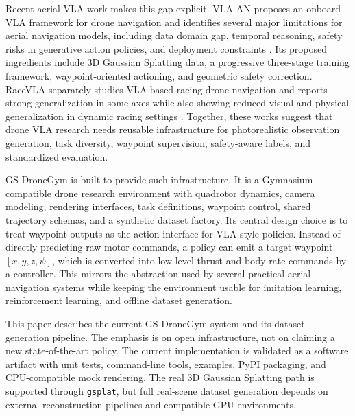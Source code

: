 \documentclass[11pt]{article}
\begin{document}
Recent aerial VLA work makes this gap explicit. VLA-AN proposes an onboard VLA framework for drone navigation and identifies several major limitations for aerial navigation models, including data domain gap, temporal reasoning, safety risks in generative action policies, and deployment constraints \cite{wu2025vlaan}. Its proposed ingredients include 3D Gaussian Splatting data, a progressive three-stage training framework, waypoint-oriented actioning, and geometric safety correction. RaceVLA separately studies VLA-based racing drone navigation and reports strong generalization in some axes while also showing reduced visual and physical generalization in dynamic racing settings \cite{serpiva2025racevla}. Together, these works suggest that drone VLA research needs reusable infrastructure for photorealistic observation generation, task diversity, waypoint supervision, safety-aware labels, and standardized evaluation.

GS-DroneGym is built to provide such infrastructure. It is a Gymnasium-compatible drone research environment with quadrotor dynamics, camera modeling, rendering interfaces, task definitions, waypoint control, shared trajectory schemas, and a synthetic dataset factory. Its central design choice is to treat waypoint outputs as the action interface for VLA-style policies. Instead of directly predicting raw motor commands, a policy can emit a target waypoint $[x,y,z,\psi]$, which is converted into low-level thrust and body-rate commands by a controller. This mirrors the abstraction used by several practical aerial navigation systems while keeping the environment usable for imitation learning, reinforcement learning, and offline dataset generation.

This paper describes the current GS-DroneGym system and its dataset-generation pipeline. The emphasis is on open infrastructure, not on claiming a new state-of-the-art policy. The current implementation is validated as a software artifact with unit tests, command-line tools, examples, PyPI packaging, and CPU-compatible mock rendering. The real 3D Gaussian Splatting path is supported through \texttt{gsplat}, but full real-scene dataset generation depends on external reconstruction pipelines and compatible GPU environments.
\end{document}
